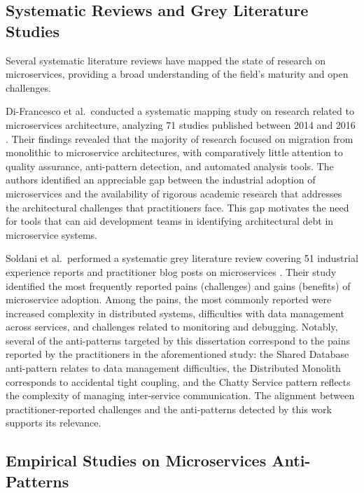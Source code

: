 \subsection{Systematic Reviews and Grey Literature Studies}
\label{subsec:systematic-reviews}

\par Several systematic literature reviews have mapped the state of research on microservices, providing a broad understanding of the field's maturity and open challenges.

Di-Francesco et al.\ conducted a systematic mapping study on research related to microservices architecture, analyzing 71 studies published between 2014 and 2016 \cite{DiFrancesco2017}. Their findings revealed that the majority of research focused on migration from monolithic to microservice architectures, with comparatively little attention to quality assurance, anti-pattern detection, and automated analysis tools. The authors identified an appreciable gap between the industrial adoption of microservices and the availability of rigorous academic research that addresses the architectural challenges that practitioners face. This gap motivates the need for tools that can aid development teams in identifying architectural debt in microservice systems.

Soldani et al.\ performed a systematic grey literature review covering 51 industrial experience reports and practitioner blog posts on microservices \cite{Soldani2018}. Their study identified the most frequently reported pains (challenges) and gains (benefits) of microservice adoption. Among the pains, the most commonly reported were increased complexity in distributed systems, difficulties with data management across services, and challenges related to monitoring and debugging. Notably, several of the anti-patterns targeted by this dissertation correspond to the pains reported by the practitioners in the aforementioned study: the Shared Database anti-pattern relates to data management difficulties, the Distributed Monolith corresponds to accidental tight coupling, and the Chatty Service pattern reflects the complexity of managing inter-service communication. The alignment between practitioner-reported challenges and the anti-patterns detected by this work supports its relevance.

\subsection{Empirical Studies on Microservices Anti-Patterns}
\label{subsec:empirical-studies}

